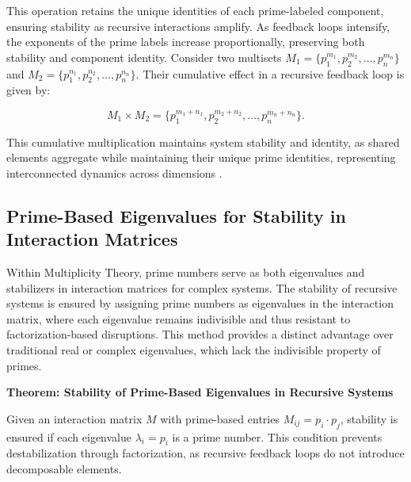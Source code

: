 \documentclass{article}
\begin{document}
This operation retains the unique identities of each prime-labeled component, ensuring stability as recursive interactions amplify. As feedback loops intensify, the exponents of the prime labels increase proportionally, preserving both stability and component identity. Consider two multisets \( M_1 = \{p_1^{m_1}, p_2^{m_2}, \ldots, p_n^{m_n}\} \) and \( M_2 = \{p_1^{n_1}, p_2^{n_2}, \ldots, p_n^{n_n}\} \). Their cumulative effect in a recursive feedback loop is given by:

\begin{equation}
M_1 \times M_2 = \{p_1^{m_1 + n_1}, p_2^{m_2 + n_2}, \ldots, p_n^{m_n + n_n}\}.
\end{equation}

This cumulative multiplication maintains system stability and identity, as shared elements aggregate while maintaining their unique prime identities, representing interconnected dynamics across dimensions \citep{blizard1989, kumar1990}.

\subsection{Prime-Based Eigenvalues for Stability in Interaction Matrices}

Within Multiplicity Theory, prime numbers serve as both eigenvalues and stabilizers in interaction matrices for complex systems. The stability of recursive systems is ensured by assigning prime numbers as eigenvalues in the interaction matrix, where each eigenvalue remains indivisible and thus resistant to factorization-based disruptions. This method provides a distinct advantage over traditional real or complex eigenvalues, which lack the indivisible property of primes.

\textbf{Theorem: Stability of Prime-Based Eigenvalues in Recursive Systems}

Given an interaction matrix \( M \) with prime-based entries \( M_{ij} = p_i \cdot p_j \), stability is ensured if each eigenvalue \( \lambda_i = p_i \) is a prime number. This condition prevents destabilization through factorization, as recursive feedback loops do not introduce decomposable elements.
\end{document}
